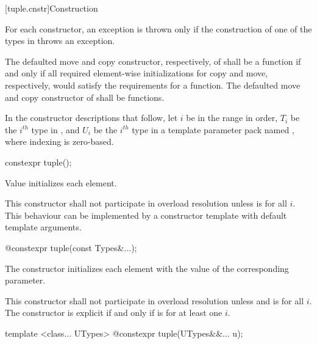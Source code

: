 [tuple.cnstr]{Construction}

\pnum
For each  constructor, an exception is thrown only if the construction of
one of the types in  throws an exception.

\pnum
The defaulted move and copy constructor, respectively, of
 shall be a  function if and only if all
required element-wise initializations for copy and move, respectively,
would satisfy the requirements for a  function. The
defaulted move and copy constructor of  shall be
 functions.

\pnum
In the constructor descriptions that follow, let $i$ be in the range
 in order, $T_i$ be the $i^{th}$ type in , and
$U_i$ be the $i^{th}$ type in a template parameter pack named , where indexing
is zero-based.

%
\begin{itemdecl}
constexpr tuple();
\end{itemdecl}

\begin{itemdescr}
\pnum
\effects  Value initializes each element.

\pnum
\remarks
This constructor shall not participate in overload resolution unless
 is  for all $i$.
\enternote This behaviour can be implemented by a constructor template
with default template arguments. \exitnote
\end{itemdescr}

%
\begin{itemdecl}
@\EXPLICIT@ constexpr tuple(const Types&...);
\end{itemdecl}

\begin{itemdescr}
\pnum
\effects The constructor initializes each element with the value of the
corresponding parameter.

\pnum
\remarks This constructor shall not participate in overload resolution unless
 and 
is  for all $i$. The constructor is explicit if and only if
 is 
for at least one $i$.
\end{itemdescr}

%
\begin{itemdecl}
template <class... UTypes>
  @\EXPLICIT@ constexpr tuple(UTypes&&... u);
\end{itemdecl}

